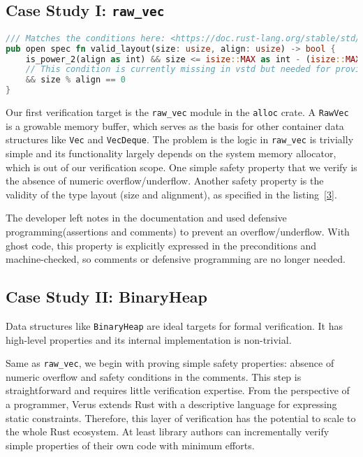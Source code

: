 \documentclass[conference]{IEEEtran}
\begin{document}
\subsection{Case Study I: \texttt{raw\_vec}}
\begin{lstlisting}[language=Rust,style=colouredRust, caption={The formal specification of a valid layout in vstd}, label = {3}]
/// Matches the conditions here: <https://doc.rust-lang.org/stable/std/alloc/struct.Layout.html>
pub open spec fn valid_layout(size: usize, align: usize) -> bool {
    is_power_2(align as int) && size <= isize::MAX as int - (isize::MAX as int % align as int)
    // This condition is currently missing in vstd but needed for proving pointer arithmics. See <https://github.com/verus-lang/verus/issues/1570>.
    && size % align == 0 
}
\end{lstlisting}
Our first verification target is the \texttt{raw\_vec} module in the \texttt{alloc} crate. A \texttt{RawVec} is a growable memory buffer, which serves as the basis for other container data structures like \texttt{Vec} and \texttt{VecDeque}. The problem is the logic in \texttt{raw\_vec} is trivially simple and its functionality largely depends on the system memory allocator, which is out of our verification scope. One simple safety property that we verify is the absence of numeric overflow/underflow. Another safety property is the validity of the type layout (size and alignment), as specified in the listing~\ref{3}. 

The developer left notes in the documentation and used defensive programming(assertions and comments) to prevent an overflow/underflow. With ghost code, this property is explicitly expressed in the preconditions and machine-checked, so comments or defensive programming are no longer needed. 

\subsection{Case Study II: BinaryHeap}
Data structures like \texttt{BinaryHeap} are ideal targets for formal verification. It has high-level properties and its internal implementation is non-trivial. 

Same as \texttt{raw\_vec}, we begin with proving simple safety properties: absence of numeric overflow and safety conditions in the comments. This step is straightforward and requires little verification expertise. From the perspective of a programmer, Verus extends Rust with a descriptive language for expressing static constraints. Therefore, this layer of verification has the potential to scale to the whole Rust ecosystem. At least library authors can incrementally verify simple properties of their own code with minimum efforts.     
\end{document}
